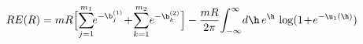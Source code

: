\begin{equation}
R E(R) =mR\Big[\!\sum_{j=1}^{m_1}\!\!
e^{-\b^{(1)}_j}\!+\!\sum_{k=1}^{m_2}\! e^{-\b^{(2)}_k}\Big]
-\frac{mR}{2\pi}\!\int_{-\infty}^{\infty}\!d\h\,
e^{\h}\,\log\!{(1\!+\!e^{-\u_1(\h)})}
\label{scaledenergies}
\end{equation}

